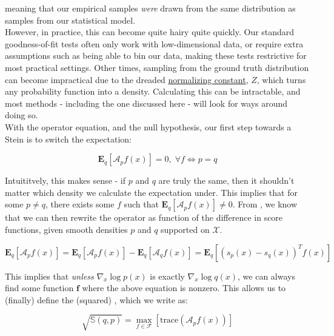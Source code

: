 \documentclass[12pt]{article}
\begin{document}
\noindent meaning that our empirical samples \textit{were} drawn from the same distribution as samples from our statistical model. \\ 

\noindent However, in practice, this can become quite hairy quite quickly. Our standard goodness-of-fit tests often only work with low-dimensional data, or require extra assumptions such as being able to bin our data, making these tests restrictive for most practical settings. Other times, sampling from the ground truth distribution can become impractical due to the dreaded \href{https://en.wikipedia.org/wiki/Normalizing_constant}{normalizing constant}, $Z$, which turns any probability function into a density. Calculating this can be intractable, and most methods - including the one discussed here - will look for ways around doing so. \\

\noindent With the operator equation, and the null hypothesis, our first step towards a Stein  is to switch the expectation:

\begin{equation}
    \mathbf{E}_q[\mathcal{A}_pf(x)] = 0, \; \forall f \Leftrightarrow p=q 
\end{equation}

\noindent Intuititvely, this makes sense - if $p$ and $q$ are truly the same, then it shouldn't matter which density we calculate the expectation under.  This implies that for some $p \neq q$, there exists some $f$ such that $\mathbf{E}_q[\mathcal{A}_pf(x)] \neq 0$. From \cite{ley2013}, we know that we can then rewrite the operator as function of the difference in score functions, given smooth densities $p$ and $q$ supported on $\mathcal{X}$.

\begin{equation}
    \mathbf{E}_q[\mathcal{A}_pf(x)] = \mathbf{E}_q[\mathcal{A}_pf(x)] - \mathbf{E}_q[\mathcal{A}_qf(x)] = \mathbf{E}_q[(s_p(x) - s_q(x))^Tf(x)] 
\end{equation}

\noindent This implies that \textit{unless} $\nabla_x \log p(x)$ is exactly $\nabla_x \log q(x)$, we can always find some function $\mathbf{f}$ where the above equation is nonzero. This allows us to (finally) define the (squared) , which we write as:

\begin{equation}
    \sqrt{\mathbb{S}(q, p)} = \max_{f \in \mathcal{F}}[\text{trace}(\mathcal{A}_pf(x))] 
\end{equation}
\end{document}
